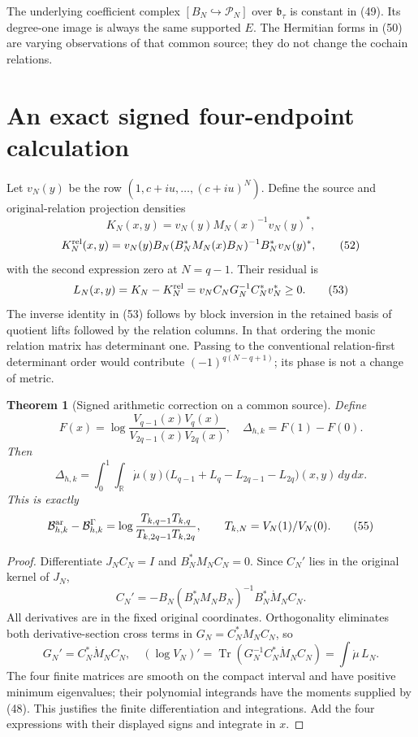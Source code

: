 \documentclass[11pt]{article}
\newtheorem{theorem}{Theorem}[section]
\begin{document}
The underlying coefficient complex $[B_N\hookrightarrow\mathcal P_N]$ over $\mathfrak b_\tau$ is constant in (49). Its degree-one image is always the same supported $E$. The Hermitian forms in (50) are varying observations of that common source; they do not change the cochain relations.

\section{An exact signed four-endpoint calculation}
Let $v_N(y)$ be the row $(1,c+iu,\ldots,(c+iu)^N)$. Define the source and original-relation projection densities
\[
 K_N(x,y)=v_N(y)M_N(x)^{-1}v_N(y)^*,
\]
\[
 K_N^{\rm rel}(x,y)
 =v_N(y)B_N(B_N^*M_N(x)B_N)^{-1}B_N^*v_N(y)^*,
 \tag{52}
\]
with the second expression zero at $N=q-1$. Their residual is
\[
 L_N(x,y)=K_N-K_N^{\rm rel}
  =v_NC_NG_N^{-1}C_N^*v_N^*\ge0.
 \tag{53}
\]
The inverse identity in (53) follows by block inversion in the retained basis of quotient lifts followed by the relation columns. In that ordering the monic relation matrix has determinant one. Passing to the conventional relation-first determinant order would contribute $(-1)^{q(N-q+1)}$; its phase is not a change of metric.

\begin{theorem}[Signed arithmetic correction on a common source]
Define
\[
 F(x)=\log\frac{V_{q-1}(x)V_q(x)}{V_{2q-1}(x)V_{2q}(x)},
 \quad \Delta_{h,k}=F(1)-F(0).
\]
Then
\[
 \boxed{\Delta_{h,k}
   =\int_0^1\!\int_{\mathbb R}\dot\mu(y)
       \bigl(L_{q-1}+L_q-L_{2q-1}-L_{2q}\bigr)(x,y)\,dy\,dx.}
 \tag{54}
\]
This is exactly
\[
 \mathcal B^{\rm ar}_{h,k}-\mathcal B^\Gamma_{h,k}
 =\log\frac{T_{k,q-1}T_{k,q}}{T_{k,2q-1}T_{k,2q}},
 \qquad T_{k,N}=V_N(1)/V_N(0).
 \tag{55}
\]
\end{theorem}
\begin{proof}
Differentiate $J_NC_N=I$ and $B_N^*M_NC_N=0$. Since $C_N'$ lies in the original kernel of $J_N$,
\[
 C_N'=-B_N(B_N^*M_NB_N)^{-1}B_N^*\dot M_NC_N.
 \tag{56}
\]
All derivatives are in the fixed original coordinates. Orthogonality eliminates both derivative-section cross terms in $G_N=C_N^*M_NC_N$, so
\[
 G_N'=C_N^*\dot M_NC_N,
 \quad(\log V_N)'=\operatorname{Tr}(G_N^{-1}C_N^*\dot M_NC_N)
                 =\int\dot\mu\,L_N.
 \tag{57}
\]
The four finite matrices are smooth on the compact interval and have positive minimum eigenvalues; their polynomial integrands have the moments supplied by (48). This justifies the finite differentiation and integrations. Add the four expressions with their displayed signs and integrate in $x$.
\end{proof}
\end{document}
